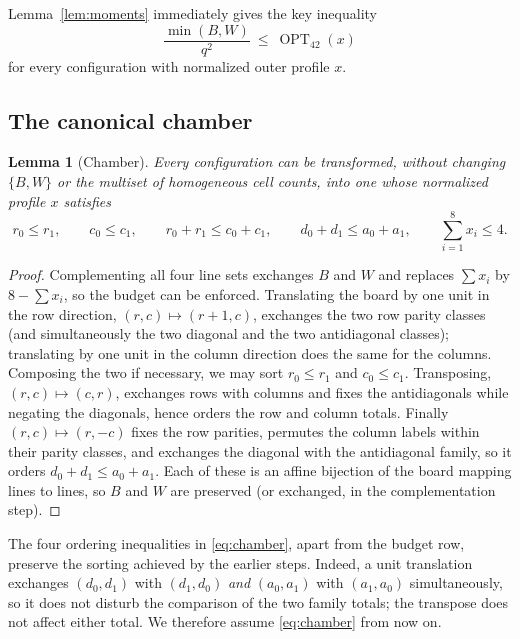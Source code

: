 \documentclass[11pt]{amsart}
\newtheorem{lemma}[theorem]{Lemma}
\theoremstyle{definition}
\theoremstyle{remark}
\newcommand{\OPT}{\operatorname{OPT}_{42}}
\begin{document}
Lemma~\ref{lem:moments} immediately gives the key inequality
\begin{equation}\label{eq:opt}
\frac{\min(B,W)}{q^2}\ \le\ \OPT(x)
\end{equation}
for every configuration with normalized outer profile $x$.

\subsection{The canonical chamber}

\begin{lemma}[Chamber]\label{lem:chamber}
Every configuration can be transformed, without changing $\{B,W\}$ or the multiset of homogeneous cell counts, into one whose normalized profile $x$ satisfies
\begin{equation}\label{eq:chamber}
r_0\le r_1,\qquad c_0\le c_1,\qquad r_0+r_1\le c_0+c_1,\qquad d_0+d_1\le a_0+a_1,\qquad \sum_{i=1}^{8}x_i\le4 .
\end{equation}
\end{lemma}

\begin{proof}
Complementing all four line sets exchanges $B$ and $W$ and replaces $\sum x_i$ by $8-\sum x_i$, so the budget can be enforced. Translating the board by one unit in the row direction, $(r,c)\mapsto(r+1,c)$, exchanges the two row parity classes (and simultaneously the two diagonal and the two antidiagonal classes); translating by one unit in the column direction does the same for the columns. Composing the two if necessary, we may sort $r_0\le r_1$ and $c_0\le c_1$. Transposing, $(r,c)\mapsto(c,r)$, exchanges rows with columns and fixes the antidiagonals while negating the diagonals, hence orders the row and column totals. Finally $(r,c)\mapsto(r,-c)$ fixes the row parities, permutes the column labels within their parity classes, and exchanges the diagonal with the antidiagonal family, so it orders $d_0+d_1\le a_0+a_1$. Each of these is an affine bijection of the board mapping lines to lines, so $B$ and $W$ are preserved (or exchanged, in the complementation step).
\end{proof}

The four ordering inequalities in \eqref{eq:chamber}, apart from the budget
row, preserve the sorting achieved by the earlier steps.  Indeed, a unit
translation exchanges $(d_0,d_1)$ with $(d_1,d_0)$ \emph{and} $(a_0,a_1)$
with $(a_1,a_0)$ simultaneously, so it does not disturb the comparison of
the two family totals; the transpose does not affect either total.  We
therefore assume \eqref{eq:chamber} from now on.
\end{document}
